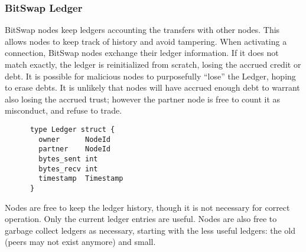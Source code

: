 \documentclass{sig-alternate}
\begin{document}




\subsubsection{BitSwap Ledger}

BitSwap nodes keep ledgers accounting the transfers with other nodes. This allows nodes to keep track of history and avoid tampering. When activating a connection, BitSwap nodes exchange their ledger information. If it does not match exactly, the ledger is reinitialized from scratch, losing the accrued credit or debt.  It is possible for malicious nodes to purposefully ``lose'' the Ledger, hoping to erase debts. It is unlikely that nodes will have accrued enough debt to warrant also losing the accrued trust; however the partner node is free to count it as misconduct, and refuse to trade.

\begin{verbatim}
      type Ledger struct {
        owner      NodeId
        partner    NodeId
        bytes_sent int
        bytes_recv int
        timestamp  Timestamp
      }
\end{verbatim}

Nodes are free to keep the ledger history, though it is not necessary for
correct operation. Only the current ledger entries are useful. Nodes are
also free to garbage collect ledgers as necessary, starting with the less
useful ledgers: the old (peers may not exist anymore) and small.
\end{document}
